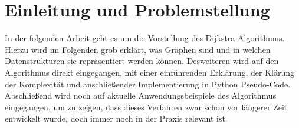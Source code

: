 \chapter{Einleitung und Problemstellung}

In der folgenden Arbeit geht es um die Vorstellung des Dijkstra-Algorithmus.
Hierzu wird im Folgenden grob erklärt, was Graphen sind und in welchen Datenstrukturen sie repräsentiert werden können.
Desweiteren wird auf den Algorithmus direkt eingegangen, mit einer einführenden Erklärung, der Klärung der Komplexität und anschließender Implementierung in Python Pseudo-Code.
Abschließend wird noch auf aktuelle Anwendungsbeispiele des Algorithmus eingegangen, um zu zeigen, dass dieses Verfahren zwar schon vor längerer Zeit entwickelt wurde, doch immer noch in der Praxis relevant ist.
